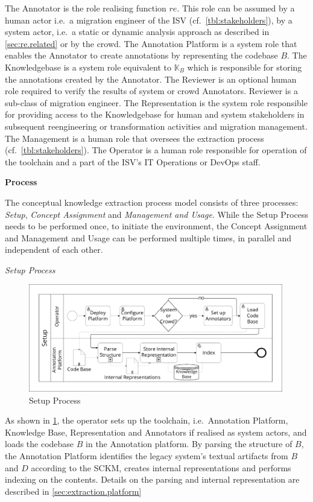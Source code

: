The Annotator is the role realising function \(re\).
This role can be assumed by a human actor i.e.~a migration engineer of the ISV (cf.~\cref{tbl:stakeholders}), by a system actor, i.e.~a static or dynamic analysis approach as described in \cref{sec:re.related} or by the crowd.
The Annotation Platform is a system role that enables the Annotator to create annotations by representing the codebase \(B\).
The Knowledgebase is a system role equivalent to \(\mathbb{K}_{B}\) which is responsible for storing the annotations created by the Annotator.
The Reviewer is an optional human role required to verify the results of system or crowd Annotators.
Reviewer is a sub-class of migration engineer.
The Representation is the system role responsible for providing access to the Knowledgebase for human and system stakeholders in subsequent reengineering or transformation activities and migration management.
The Management is a human role that oversees the extraction process (cf.~\cref{tbl:stakeholders}).
The Operator is a human role responsible for operation of the toolchain and a part of the ISV's IT Operations or DevOps staff.

\textbf{Process}

The conceptual knowledge extraction process model consists of three processes: \emph{Setup}, \emph{Concept Assignment} and \emph{Management and Usage}.
While the Setup Process needs to be performed once, to initiate the environment, the Concept Assignment and Management and Usage can be performed multiple times, in parallel and independent of each other.

\emph{Setup Process}

\begin{figure}
\hypertarget{fig:awsm.re.setup}{%
\centering
\includegraphics[width=0.99\textwidth]{../figures/awsm-re-setup.pdf}
\caption{Setup Process}\label{fig:awsm.re.setup}
}
\end{figure}

As shown in \cref{fig:awsm.re.setup}, the operator sets up the toolchain, i.e.~Annotation Platform, Knowledge Base, Representation and Annotators if realised as system actors, and loads the codebase \(B\) in the Annotation platform.
By parsing the structure of \(B\), the Annotation Platform identifies the legacy system's textual artifacts from \(B\) and \(D\) according to the SCKM, creates internal representations and performs indexing on the contents.
Details on the parsing and internal representation are described in \cref{sec:extraction.platform}


